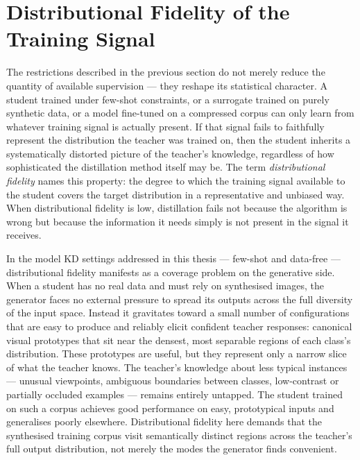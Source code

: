 \section{Distributional Fidelity of the Training Signal} \label{sec:13-introduction-fidelity}

\begin{foldable}
  The restrictions described in the previous section do not merely reduce the quantity of available supervision — they reshape its statistical character.
  A student trained under few-shot constraints, or a surrogate trained on purely synthetic data, or a model fine-tuned on a compressed corpus can only learn from whatever training signal is actually present.
  If that signal fails to faithfully represent the distribution the teacher was trained on, then the student inherits a systematically distorted picture of the teacher's knowledge, regardless of how sophisticated the distillation method itself may be.
  The term \emph{distributional fidelity} names this property: the degree to which the training signal available to the student covers the target distribution in a representative and unbiased way.
  When distributional fidelity is low, distillation fails not because the algorithm is wrong but because the information it needs simply is not present in the signal it receives.
\end{foldable}

\begin{foldable}
  In the model \ac{KD} settings addressed in this thesis — few-shot and data-free — distributional fidelity manifests as a coverage problem on the generative side.
  When a student has no real data and must rely on synthesised images, the generator faces no external pressure to spread its outputs across the full diversity of the input space.
  Instead it gravitates toward a small number of configurations that are easy to produce and reliably elicit confident teacher responses: canonical visual prototypes that sit near the densest, most separable regions of each class's distribution.
  These prototypes are useful, but they represent only a narrow slice of what the teacher knows.
  The teacher's knowledge about less typical instances — unusual viewpoints, ambiguous boundaries between classes, low-contrast or partially occluded examples — remains entirely untapped.
  The student trained on such a corpus achieves good performance on easy, prototypical inputs and generalises poorly elsewhere.
  Distributional fidelity here demands that the synthesised training corpus visit semantically distinct regions across the teacher's full output distribution, not merely the modes the generator finds convenient.
\end{foldable}

